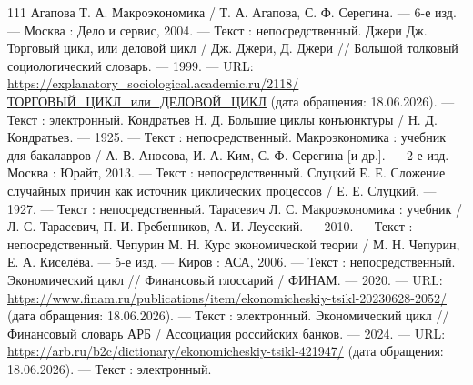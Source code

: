 \providecommand{\bibaccessdate}{18.06.2026}

\begin{RaggedRight}
\begin{thebibliography}{111}
     \hypertarget{bib:Агапова-2004}{} Агапова Т. А. Макроэкономика / Т. А. Агапова, С. Ф. Серегина. --- 6-е изд. --- Москва : Дело и сервис, 2004. --- Текст : непосредственный.
     \hypertarget{bib:Джери-1999}{} Джери Дж. Торговый цикл, или деловой цикл / Дж. Джери, Д. Джери // Большой толковый социологический словарь. --- 1999. --- URL: \url{https://explanatory_sociological.academic.ru/2118/ТОРГОВЫЙ_ЦИКЛ_или_ДЕЛОВОЙ_ЦИКЛ} (дата обращения: \bibaccessdate). --- Текст : электронный.
     \hypertarget{bib:Кондратьев-1925}{} Кондратьев Н. Д. Большие циклы конъюнктуры / Н. Д. Кондратьев. --- 1925. --- Текст : непосредственный.
     \hypertarget{bib:Аносова-2013}{} Макроэкономика : учебник для бакалавров / А. В. Аносова, И. А. Ким, С. Ф. Серегина [и др.]. --- 2-е изд. --- Москва : Юрайт, 2013. --- Текст : непосредственный.
     \hypertarget{bib:Слуцкий-1927}{} Слуцкий Е. Е. Сложение случайных причин как источник циклических процессов / Е. Е. Слуцкий. --- 1927. --- Текст : непосредственный.
     \hypertarget{bib:Тарасевич-2010}{} Тарасевич Л. С. Макроэкономика : учебник / Л. С. Тарасевич, П. И. Гребенников, А. И. Леусский. --- 2010. --- Текст : непосредственный.
     \hypertarget{bib:Чепурин-2006}{} Чепурин М. Н. Курс экономической теории / М. Н. Чепурин, Е. А. Киселёва. --- 5-е изд. --- Киров : АСА, 2006. --- Текст : непосредственный.
     \hypertarget{bib:ФИНАМ-2020}{} Экономический цикл // Финансовый глоссарий / ФИНАМ. --- 2020. --- URL: \url{https://www.finam.ru/publications/item/ekonomicheskiy-tsikl-20230628-2052/} (дата обращения: \bibaccessdate). --- Текст : электронный.
     \hypertarget{bib:АРБ-2024}{} Экономический цикл // Финансовый словарь АРБ / Ассоциация российских банков. --- 2024. --- URL: \url{https://arb.ru/b2c/dictionary/ekonomicheskiy-tsikl-421947/} (дата обращения: \bibaccessdate). --- Текст : электронный.


\end{thebibliography}
\end{RaggedRight}
